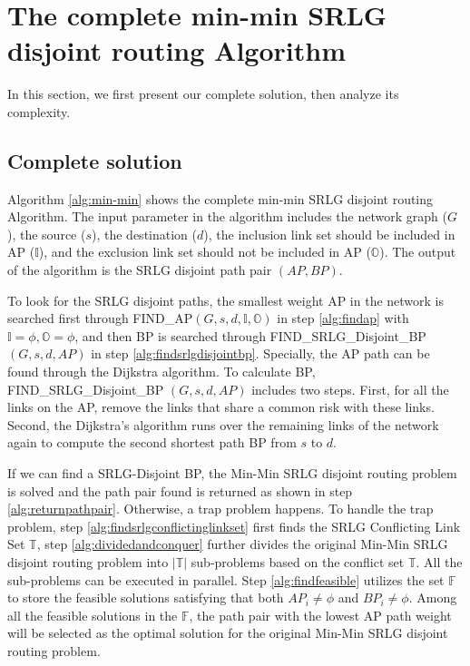 \section{The complete min-min SRLG disjoint routing Algorithm}
\label{sec:Route Algorithm}
In this section, we first present our complete solution, then analyze its complexity.
\subsection{Complete solution}
Algorithm \ref{alg:min-min} shows the complete min-min SRLG disjoint routing Algorithm. The input parameter in the algorithm includes  the network graph ($G$), the source ($s$), the destination  ($d$), the inclusion link set should be included in AP ($\mathbb{I}$), and the exclusion link set should not be included in AP ($\mathbb{O}$). The output of the algorithm is the SRLG disjoint path pair $(AP,BP)$.

To look for the SRLG disjoint paths, the smallest weight AP in the network is searched  first through FIND\_AP$(G,s,d, \mathbb{I},\mathbb{O})$ in step \ref{alg:findap} with $\mathbb{I}=\phi,\mathbb{O}=\phi$, and then BP is searched through  FIND\_SRLG\_Disjoint\_BP
$(G,s,d,AP)$ in step \ref{alg:findsrlgdisjointbp}. Specially, the AP path can be found through the Dijkstra algorithm. To calculate BP, FIND\_SRLG\_Disjoint\_BP
$(G,s,d,AP)$ includes two steps. First, for all the links on the AP, remove the links that share a common risk with these links. Second, the Dijkstra's algorithm runs over the remaining links of the network again to compute the second shortest path BP from $s$ to $d$.

If we can find a SRLG-Disjoint BP, the Min-Min SRLG disjoint routing problem is solved and  the path pair found is returned as shown in step \ref{alg:returnpathpair}. Otherwise, a trap problem happens. To handle the trap problem, step  \ref{alg:findsrlgconflictinglinkset} first finds the SRLG Conflicting Link Set $\mathbb{T}$, step \ref{alg:dividedandconquer} further divides the original  Min-Min SRLG disjoint routing problem into $\left| \mathbb{T} \right|$ sub-problems based on the conflict set $\mathbb{T}$. All the sub-problems can be executed in parallel. Step \ref{alg:findfeasible} utilizes the set $\mathbb{F}$ to store the feasible solutions  satisfying that  both $A{P_i} \ne \phi$ and $B{P_i} \ne \phi$. Among all the feasible solutions in the $\mathbb{F}$, the path pair with the lowest AP path weight will be selected as the optimal solution for the original Min-Min SRLG disjoint routing problem.

